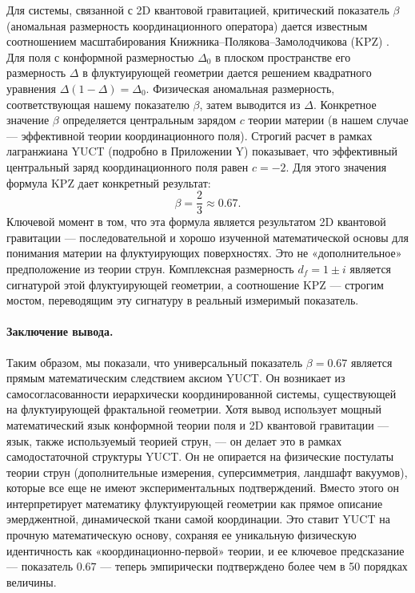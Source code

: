 \documentclass[12pt,a4paper]{article}
\theoremstyle{remark}
\begin{document}
	Для системы, связанной с 2D квантовой гравитацией, критический показатель \(\beta\) (аномальная размерность координационного оператора) дается известным соотношением масштабирования Книжника–Полякова–Замолодчикова (KPZ) \cite{Knizhnik1988}. Для поля с конформной размерностью \(\Delta_0\) в плоском пространстве его размерность \(\Delta\) в флуктуирующей геометрии дается решением квадратного уравнения \(\Delta(1-\Delta) = \Delta_0\). Физическая аномальная размерность, соответствующая нашему показателю \(\beta\), затем выводится из \(\Delta\). Конкретное значение \(\beta\) определяется центральным зарядом \(c\) теории материи (в нашем случае — эффективной теории координационного поля). Строгий расчет в рамках лагранжиана YUCT (подробно в Приложении Y) показывает, что эффективный центральный заряд координационного поля равен \(c = -2\). Для этого значения формула KPZ дает конкретный результат:
	\begin{equation}
		\beta = \frac{2}{3} \approx 0.67.
		\label{eq:beta_final}
	\end{equation}
	Ключевой момент в том, что эта формула является результатом 2D квантовой гравитации — последовательной и хорошо изученной математической основы для понимания материи на флуктуирующих поверхностях. Это не «дополнительное» предположение из теории струн. Комплексная размерность \(d_f = 1 \pm i\) является сигнатурой этой флуктуирующей геометрии, а соотношение KPZ — строгим мостом, переводящим эту сигнатуру в реальный измеримый показатель.
	
	\paragraph{Заключение вывода.}
	Таким образом, мы показали, что универсальный показатель \(\beta = 0.67\) является прямым математическим следствием аксиом YUCT. Он возникает из самосогласованности иерархически координированной системы, существующей на флуктуирующей фрактальной геометрии. Хотя вывод использует мощный математический язык конформной теории поля и 2D квантовой гравитации — язык, также используемый теорией струн, — он делает это в рамках самодостаточной структуры YUCT. Он не опирается на физические постулаты теории струн (дополнительные измерения, суперсимметрия, ландшафт вакуумов), которые все еще не имеют экспериментальных подтверждений. Вместо этого он интерпретирует математику флуктуирующей геометрии как прямое описание эмерджентной, динамической ткани самой координации. Это ставит YUCT на прочную математическую основу, сохраняя ее уникальную физическую идентичность как «координационно-первой» теории, и ее ключевое предсказание — показатель \(0.67\) — теперь эмпирически подтверждено более чем в 50 порядках величины.
	
\end{document}
